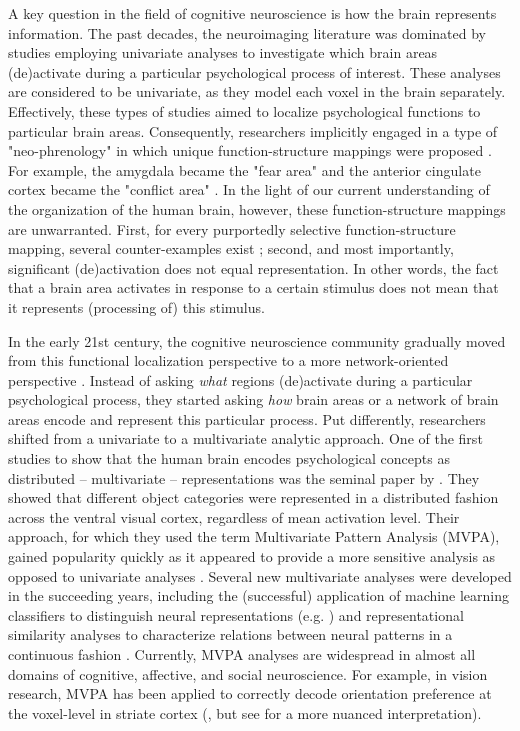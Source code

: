 \documentclass[12pt,a4paper]{article}\usepackage[]{graphicx}\usepackage[]{color}
\begin{document}
A key question in the field of cognitive neuroscience is how the brain represents information. The past decades, the neuroimaging literature was dominated by studies employing univariate analyses to investigate which brain areas (de)activate during a particular psychological process of interest. These analyses are considered to be univariate, as they model each voxel in the brain separately. Effectively, these types of studies aimed to localize psychological functions to particular brain areas. Consequently, researchers implicitly engaged in a type of "neo-phrenology" in which unique function-structure mappings were proposed \citep{poldrack2010}. For example, the amygdala became the "fear area" \citep{ledoux2003} and the anterior cingulate cortex became the "conflict area" \citep{vanveen2002}. In the light of our current understanding of the organization of the human brain, however, these function-structure mappings are unwarranted. First, for every purportedly selective function-structure mapping, several counter-examples exist \citep{poldrack2010}; second, and most importantly, significant (de)activation does not equal representation. In other words, the fact that a brain area activates in response to a certain stimulus does not mean that it represents (processing of) this stimulus.  

In the early 21st century, the cognitive neuroscience community gradually moved from this functional localization perspective to a more network-oriented perspective \citep{sporns2002}. Instead of asking \emph{what} regions (de)activate during a particular psychological process, they started asking \emph{how} brain areas or a network of brain areas encode and represent this particular process. Put differently, researchers shifted from a univariate to a multivariate analytic approach. One of the first studies to show that the human brain encodes psychological concepts as distributed -- multivariate -- representations was the seminal paper by \cite{haxby2001}. They showed that different object categories were represented in a distributed fashion across the ventral visual cortex, regardless of mean activation level. Their approach, for which they used the term Multivariate Pattern Analysis (MVPA), gained popularity quickly as it appeared to provide a more sensitive analysis as opposed to univariate analyses \citep{norman2006,haxby2012}. Several new multivariate analyses were developed in the succeeding years, including the (successful) application of machine learning classifiers to distinguish neural representations (e.g. \citealp{cox2003}) and representational similarity analyses to characterize relations between neural patterns in a continuous fashion \citep{kriegeskorte2008}. Currently, MVPA analyses are widespread in almost all domains of cognitive, affective, and social neuroscience. For example, in vision research, MVPA has been applied to correctly decode orientation preference at the voxel-level in striate cortex (\citealp{kamitani2005}, but see \citealp{opdebeeck2010} for a more nuanced interpretation).    
\end{document}
